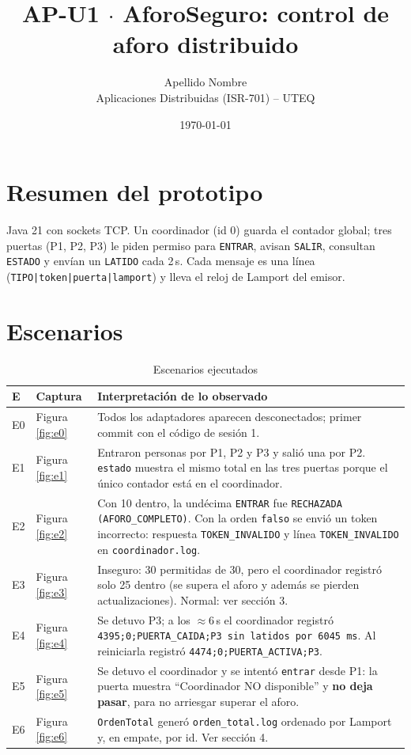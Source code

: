 \documentclass[11pt,a4paper]{article}
\title{AP-U1 $\cdot$ AforoSeguro: control de aforo distribuido}
\author{Apellido Nombre \\ Aplicaciones Distribuidas (ISR-701) -- UTEQ}
\date{\today}
\begin{document}
\maketitle

\section{Resumen del prototipo}
Java 21 con sockets TCP. Un coordinador (id 0) guarda el contador global; tres puertas
(P1, P2, P3) le piden permiso para \texttt{ENTRAR}, avisan \texttt{SALIR}, consultan
\texttt{ESTADO} y envían un \texttt{LATIDO} cada 2\,s. Cada mensaje es una línea
(\texttt{TIPO|token|puerta|lamport}) y lleva el reloj de Lamport del emisor.

\section{Escenarios}

\begin{table}[h]
\centering
\begin{tabular}{|p{0.6cm}|p{2.4cm}|p{12cm}|}
\hline
\textbf{E} & \textbf{Captura} & \textbf{Interpretación de lo observado} \\ \hline
E0 & Figura \ref{fig:e0} & Todos los adaptadores aparecen desconectados; primer commit con el código de sesión 1. \\ \hline
E1 & Figura \ref{fig:e1} & Entraron personas por P1, P2 y P3 y salió una por P2. \texttt{estado} muestra el mismo total en las tres puertas porque el único contador está en el coordinador. \\ \hline
E2 & Figura \ref{fig:e2} & Con 10 dentro, la undécima \texttt{ENTRAR} fue \texttt{RECHAZADA (AFORO\_COMPLETO)}. Con la orden \texttt{falso} se envió un token incorrecto: respuesta \texttt{TOKEN\_INVALIDO} y línea \texttt{TOKEN\_INVALIDO} en \texttt{coordinador.log}. \\ \hline
E3 & Figura \ref{fig:e3} & Inseguro: 30 permitidas de 30, pero el coordinador registró solo 25 dentro (se supera el aforo y además se pierden actualizaciones). Normal: ver sección 3. \\ \hline
E4 & Figura \ref{fig:e4} & Se detuvo P3; a los $\approx$6\,s el coordinador registró \texttt{4395;0;PUERTA\_CAIDA;P3 sin latidos por 6045 ms}. Al reiniciarla registró \texttt{4474;0;PUERTA\_ACTIVA;P3}. \\ \hline
E5 & Figura \ref{fig:e5} & Se detuvo el coordinador y se intentó \texttt{entrar} desde P1: la puerta muestra ``Coordinador NO disponible'' y \textbf{no deja pasar}, para no arriesgar superar el aforo. \\ \hline
E6 & Figura \ref{fig:e6} & \texttt{OrdenTotal} generó \texttt{orden\_total.log} ordenado por Lamport y, en empate, por id. Ver sección 4. \\ \hline
\end{tabular}
\caption{Escenarios ejecutados}
\end{table}
\end{document}
